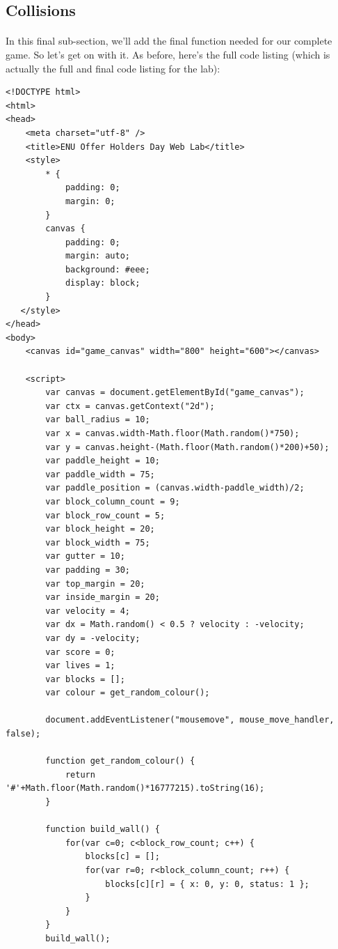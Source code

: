 \documentclass[10pt, a4paper, oneside]{article}
\begin{document}
\subsection{Collisions}
\label{section:collisions}

\paragraph{} In this final sub-section, we'll add the final function needed for our complete game. So let's get on with it. As before, here's the full code listing (which is actually the full and final code listing for the lab):

\begin{lstlisting}
<!DOCTYPE html>
<html>
<head>
    <meta charset="utf-8" />
    <title>ENU Offer Holders Day Web Lab</title>
    <style>
        * { 
            padding: 0; 
            margin: 0; 
        } 
        canvas { 
            padding: 0; 
            margin: auto; 
            background: #eee; 
            display: block; 
        }
   </style>
</head>
<body>
    <canvas id="game_canvas" width="800" height="600"></canvas>

    <script>
        var canvas = document.getElementById("game_canvas");
        var ctx = canvas.getContext("2d");
        var ball_radius = 10;
        var x = canvas.width-Math.floor(Math.random()*750);
        var y = canvas.height-(Math.floor(Math.random()*200)+50);
        var paddle_height = 10;
        var paddle_width = 75;
        var paddle_position = (canvas.width-paddle_width)/2;
        var block_column_count = 9;
        var block_row_count = 5;
        var block_height = 20;
        var block_width = 75;
        var gutter = 10;
        var padding = 30;
        var top_margin = 20;
        var inside_margin = 20;
        var velocity = 4;
        var dx = Math.random() < 0.5 ? velocity : -velocity;
        var dy = -velocity;
        var score = 0;
        var lives = 1;
        var blocks = [];
        var colour = get_random_colour();

        document.addEventListener("mousemove", mouse_move_handler, false);

        function get_random_colour() {
            return '#'+Math.floor(Math.random()*16777215).toString(16);
        }

        function build_wall() {
            for(var c=0; c<block_row_count; c++) {
                blocks[c] = [];
                for(var r=0; r<block_column_count; r++) {
                    blocks[c][r] = { x: 0, y: 0, status: 1 };
                }
            }
        }
        build_wall();
        

\end{lstlisting}
\end{document}
